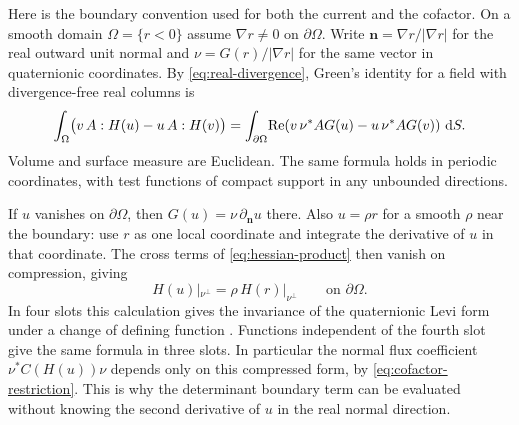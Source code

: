 Here is the boundary convention used for both the current and the
cofactor. On a smooth domain $\Omega=\{r<0\}$ assume $\nabla r\ne0$
on $\partial\Omega$. Write $\mathbf n=\nabla r/|\nabla r|$ for the
real outward unit normal and $\nu=G(r)/|\nabla r|$ for the same
vector in quaternionic coordinates. By \eqref{eq:real-divergence},
Green's identity for a field with divergence-free real columns is
\begin{equation}\label{eq:calculus-green}
 \int_\Omega\!\big(v\,A:H(u)-u\,A:H(v)\big)
  =\int_{\partial\Omega}\!
       \operatorname{Re}\!\left(v\,\nu^*A G(u)-u\,\nu^*A G(v)\right)\,\mathrm d S .
\end{equation}
Volume and surface measure are Euclidean. The same formula holds in
periodic coordinates, with test functions of compact support in any
unbounded directions.

If $u$ vanishes on $\partial\Omega$, then $G(u)=\nu\,\partial_{\mathbf n}u$
there. Also $u=\rho r$ for a smooth $\rho$ near the boundary: use $r$
as one local coordinate and integrate the derivative of $u$ in that
coordinate. The cross
terms of \eqref{eq:hessian-product} then vanish on compression, giving
\begin{equation}\label{eq:boundary-restriction}
 H(u)|_{\nu^\perp}=\rho\,H(r)|_{\nu^\perp}\qquad\text{on }\partial\Omega .
\end{equation}
In four slots this calculation gives the invariance of the quaternionic
Levi form under a change of defining function \cite{Alesker2003MA}.
Functions independent of the fourth slot give the same formula in three slots.
In particular the normal flux coefficient $\nu^*C(H(u))\nu$ depends
only on this compressed form, by \eqref{eq:cofactor-restriction}.
This is why the determinant boundary term can be evaluated without
knowing the second derivative of $u$ in the real normal direction.
